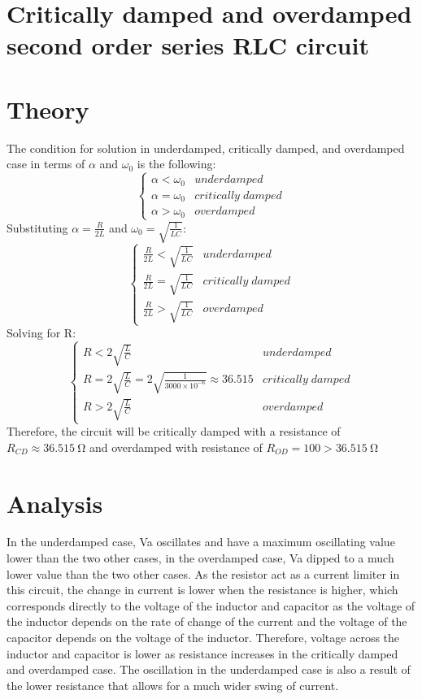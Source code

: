 \documentclass{article}
\begin{document}
\section{Critically damped and overdamped second order series RLC circuit}

\section*{Theory}
The condition for solution in underdamped, critically damped, and overdamped case in terms of $\alpha$ and $\omega_0$ is the following:
\[ \begin{cases} 
      \alpha < \omega_0 & underdamped \\
      \alpha = \omega_0 & critically\; damped \\
      \alpha > \omega_0 & overdamped 
   \end{cases}
\]
Substituting $\alpha = \frac{R}{2L}$ and $\omega_0 = \sqrt{\frac{1}{LC}}$:
\[ \begin{cases} 
      \frac{R}{2L} < \sqrt{\frac{1}{LC}} & underdamped \\
      \frac{R}{2L} = \sqrt{\frac{1}{LC}} & critically\; damped \\
      \frac{R}{2L} > \sqrt{\frac{1}{LC}} & overdamped 
   \end{cases}
\]
Solving for R:
\[ \begin{cases} 
      R < 2\sqrt{\frac{L}{C}} & underdamped \\
      R = 2\sqrt{\frac{L}{C}}=2\sqrt{\frac{1}{3000\times10^{-6}}}\approx36.515 & critically\; damped \\
      R > 2\sqrt{\frac{L}{C}} & overdamped 
   \end{cases}
\]
Therefore, the circuit will be critically damped with a resistance of $R_{CD} \approx \SI{36.515}{\ohm}$ and overdamped with resistance of $R_{OD} = 100 > \SI{36.515}{\ohm}$
\section*{Analysis}
In the underdamped case, Va oscillates and have a maximum oscillating value lower than the two other cases, in the overdamped case, Va dipped to a much lower value than the two other cases. As the resistor act as a current limiter in this circuit, the change in current is lower when the resistance is higher, which corresponds directly to the voltage of the inductor and capacitor as the voltage of the inductor depends on the rate of change of the current and the voltage of the capacitor depends on the voltage of the inductor. Therefore, voltage across the inductor and capacitor is lower as resistance increases in the critically damped and overdamped case. The oscillation in the underdamped case is also a result of the lower resistance that allows for a much wider swing of current.
\end{document}
